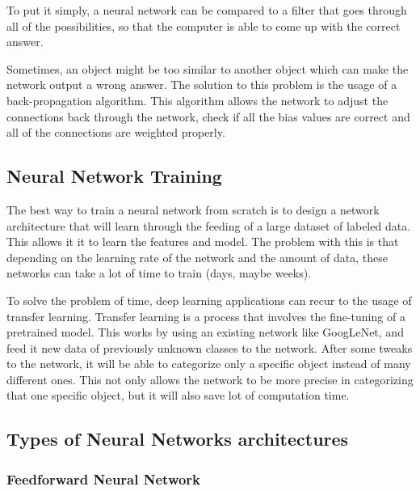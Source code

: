     
   
    \par To put it simply, a neural network can be compared to a filter that goes through all of the possibilities, so that the computer is able to come up with the correct answer.
    \par Sometimes, an object might be too similar to another object which can make the network output a wrong answer. The solution to this problem is the usage of a back-propagation algorithm. This algorithm allows the network to adjust the connections back through the network, check if all the bias values are correct and all of the connections are weighted properly. \cite{ArmaanMerchant2018}
    


        \subsection{Neural Network Training}

        \par The best way to train a neural network from scratch is to design a network architecture that will learn through the feeding of a large dataset of labeled data. This allows it it to learn the features and model. The problem with this is that depending on the learning rate of the network and the amount of data, these networks can take a lot of time to train (days, maybe weeks). 

        \par To solve the problem of time, deep learning applications can recur to the usage of transfer learning. Transfer learning is a process that involves the fine-tuning of a pretrained model. This works by using an existing network like GoogLeNet, and feed it new data of previously unknown classes to the network. After some tweaks to the network, it will be able to categorize only a specific object instead of many different ones. This not only allows the network to be more precise in categorizing that one specific object, but it will also save lot of computation time.  \cite{mathworks_deeplearning}

        \subsection{Types of Neural Networks architectures}

            \subsubsection{Feedforward Neural Network}
            
